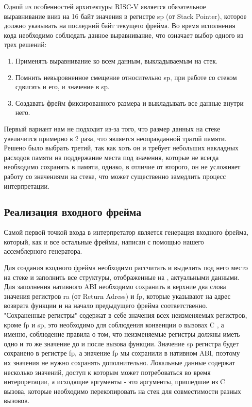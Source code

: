     Одной из особенностей архитектуры RISC-V является обязательное выравнивание вниз на 16 байт значения в регистре sp (от Stack Pointer), которое должно указывать на последний байт текущего фрейма. Во время исполнения кода необходимо соблюдать данное выравнивание, что означает выбор одного из трех решений:
\begin{enumerate}
    \item Применять выравнивание ко всем данным, выкладываемым на стек.
    \item Помнить невыровненное смещение относительно sp, при работе со стеком сдвигать и его, и значение в sp.
    \item Создавать фрейм фиксированного размера и выкладывать все данные внутри него.
\end{enumerate}

Первый вариант нам не подходит из-за того, что размер данных на стеке увеличится примерно в 2 раза, что является неоправданной тратой памяти. Решено было выбрать третий, так как хоть он и требует небольших накладных расходов памяти на поддержание места под значения, которые не всегда необходимо сохранять в памяти, однако, в отличие от второго, он не усложняет работу со значениями на стеке, что может существенно замедлить процесс интерпретации.

\subsection{Реализация входного фрейма}

Самой первой точкой входа в интерпретатор является генерация входного фрейма, который, как и все остальные фреймы, написан с помощью нашего ассемблерного генератора. 

Для создания входного фрейма необходимо рассчитать и выделить под него место на стеке и заполнить все структуры, отображенные на , актуальными данными. Для заполнения нативного ABI необходимо сохранить в верхние два слова значения регистров ra (от Return Adress) и fp, которые указывают на адрес возврата функции и на начало предыдущего фрейма соответственно. "Сохраненные регистры" содержат в себе значения всех неизменяемых регистров, кроме fp и sp, это необходимо для соблюдения конвенции о вызовах C \cite{riscv:convention}, а именно, соблюдение правила о том, что неизменяемые регистры должны иметь одно и то же значение до и после вызова функции. Значение sp регистра будет сохранено в регистре fp, а значение fp мы сохранили в нативном ABI, поэтому их значения не нужно сохранять дополнительно. Локальные данные содержат несколько значений, доступ к которым может потребоваться во время интерпретации, а исходящие аргументы - это аргументы, пришедшие из C вызова, которые необходимо перекопировать на стек для совместимости разных вызовов.
 
